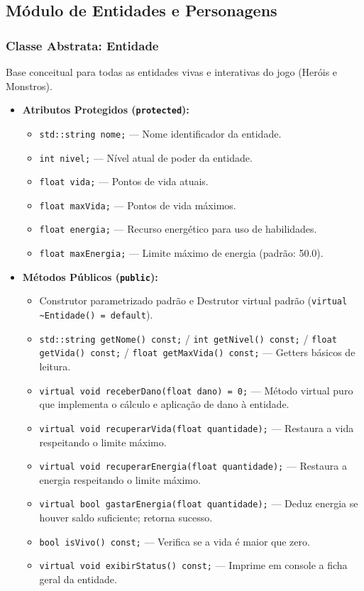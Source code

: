 \documentclass[12pt,a4paper]{article}
\begin{document}
\subsection{Módulo de Entidades e Personagens}

\subsubsection{Classe Abstrata: Entidade}
Base conceitual para todas as entidades vivas e interativas do jogo (Heróis e Monstros).
\begin{itemize}
    \item \textbf{Atributos Protegidos (\texttt{protected}):}
    \begin{itemize}
        \item \texttt{std::string nome;} --- Nome identificador da entidade.
        \item \texttt{int nivel;} --- Nível atual de poder da entidade.
        \item \texttt{float vida;} --- Pontos de vida atuais.
        \item \texttt{float maxVida;} --- Pontos de vida máximos.
        \item \texttt{float energia;} --- Recurso energético para uso de habilidades.
        \item \texttt{float maxEnergia;} --- Limite máximo de energia (padrão: 50.0).
    \end{itemize}
    \item \textbf{Métodos Públicos (\texttt{public}):}
    \begin{itemize}
        \item Construtor parametrizado padrão e Destrutor virtual padrão (\texttt{virtual \textasciitilde{}Entidade() = default}).
        \item \texttt{std::string getNome() const;} / \texttt{int getNivel() const;} / \texttt{float getVida() const;} / \texttt{float getMaxVida() const;} --- Getters básicos de leitura.
        \item \texttt{virtual void receberDano(float dano) = 0;} --- Método virtual puro que implementa o cálculo e aplicação de dano à entidade.
        \item \texttt{virtual void recuperarVida(float quantidade);} --- Restaura a vida respeitando o limite máximo.
        \item \texttt{virtual void recuperarEnergia(float quantidade);} --- Restaura a energia respeitando o limite máximo.
        \item \texttt{virtual bool gastarEnergia(float quantidade);} --- Deduz energia se houver saldo suficiente; retorna sucesso.
        \item \texttt{bool isVivo() const;} --- Verifica se a vida é maior que zero.
        \item \texttt{virtual void exibirStatus() const;} --- Imprime em console a ficha geral da entidade.
    \end{itemize}
\end{itemize}
\end{document}
